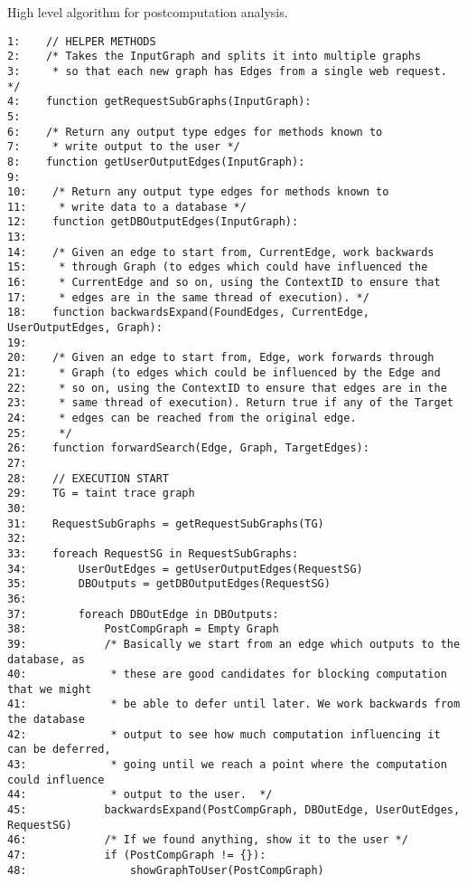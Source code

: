\documentclass[msc,oneside]{ubcthesis}
\begin{document}
\begin{Program}
  \caption{\label{prog:code3} High level algorithm for postcomputation analysis.}
\begin{verbatim}
1:    // HELPER METHODS
2:    /* Takes the InputGraph and splits it into multiple graphs
3:     * so that each new graph has Edges from a single web request. */
4:    function getRequestSubGraphs(InputGraph):
5:    
6:    /* Return any output type edges for methods known to 
7:     * write output to the user */
8:    function getUserOutputEdges(InputGraph):
9:    
10:    /* Return any output type edges for methods known to
11:     * write data to a database */
12:    function getDBOutputEdges(InputGraph):
13:    
14:    /* Given an edge to start from, CurrentEdge, work backwards
15:     * through Graph (to edges which could have influenced the
16:     * CurrentEdge and so on, using the ContextID to ensure that
17:     * edges are in the same thread of execution). */
18:    function backwardsExpand(FoundEdges, CurrentEdge, UserOutputEdges, Graph):
19:    
20:    /* Given an edge to start from, Edge, work forwards through
21:     * Graph (to edges which could be influenced by the Edge and
22:     * so on, using the ContextID to ensure that edges are in the
23:     * same thread of execution). Return true if any of the Target
24:     * edges can be reached from the original edge.
25:     */    
26:    function forwardSearch(Edge, Graph, TargetEdges):
27:    
28:    // EXECUTION START
29:    TG = taint trace graph
30:
31:    RequestSubGraphs = getRequestSubGraphs(TG)
32:    
33:    foreach RequestSG in RequestSubGraphs:
34:        UserOutEdges = getUserOutputEdges(RequestSG)
35:        DBOutputs = getDBOutputEdges(RequestSG)
36:        
37:        foreach DBOutEdge in DBOutputs:
38:            PostCompGraph = Empty Graph
39:            /* Basically we start from an edge which outputs to the database, as
40:             * these are good candidates for blocking computation that we might
41:             * be able to defer until later. We work backwards from the database
42:             * output to see how much computation influencing it can be deferred,
43:             * going until we reach a point where the computation could influence
44:             * output to the user.  */
45:            backwardsExpand(PostCompGraph, DBOutEdge, UserOutEdges, RequestSG)
46:            /* If we found anything, show it to the user */
47:            if (PostCompGraph != {}):
48:                showGraphToUser(PostCompGraph)
\end{verbatim}
\end{Program}
\end{document}
